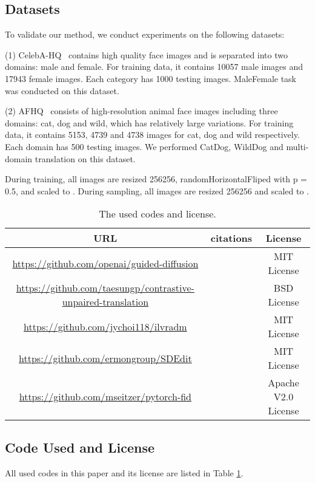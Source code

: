 \documentclass{article}
\begin{document}
\subsection{Datasets}
To validate our method, we conduct experiments on the following datasets: 

(1) CelebA-HQ~\cite{karras2018progressive} contains high quality face images and is separated into two domains: male and female. For training data, it contains 10057 male images and 17943 female images. Each category has 1000 testing images. MaleFemale task was conducted on this dataset. 

(2) AFHQ~\cite{choi2020stargan} consists of high-resolution animal face images including three domains: cat, dog and wild, which has relatively large variations. For training data, it contains 5153, 4739 and 4738 images for cat, dog and wild respectively. Each domain has 500 testing images. We performed CatDog, WildDog and multi-domain translation on this dataset. 

During training, all images are resized 256256, randomHorizontalFliped with p = 0.5, and scaled to . During sampling, all images are resized 256256 and scaled to .  \begin{table}[]
\caption{The used codes and license.}
\vspace{.2cm}
\label{tb:code}
\centering
\renewcommand\arraystretch{1.2}
\begin{tabular}{ccc}
\toprule
URL     & citations & License  \\
\midrule
\href{https://github.com/openai/guided-diffusion}{https://github.com/openai/guided-diffusion} & \cite{dhariwal2021diffusion}&MIT License\\
\href{https://github.com/taesungp/contrastive-unpaired-translation}{https://github.com/taesungp/contrastive-unpaired-translation} & \cite{park2020contrastive}       & BSD License    \\
\href{https://github.com/jychoi118/ilvr_adm}{https://github.com/jychoi118/ilvradm} & \cite{choi2021ilvr}      & MIT License \\
\href{https://github.com/ermongroup/SDEdit}{https://github.com/ermongroup/SDEdit} & \cite{meng2021sdedit}      & MIT License\\
\href{https://github.com/mseitzer/pytorch-fid}{https://github.com/mseitzer/pytorch-fid} &\cite{heusel2017gans} &Apache V2.0 License\\
\bottomrule
\end{tabular}
\end{table}
\subsection{Code Used and License}
All used codes in this paper and its license are listed in Table \ref{tb:code}.
\end{document}
